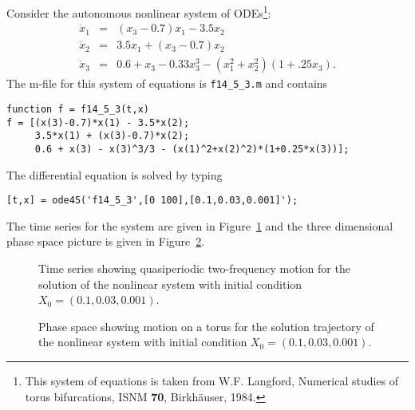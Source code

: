 \documentclass{ximera}
\begin{document}
Consider the autonomous nonlinear system of ODEs\footnote{This system of
equations is taken from W.F. Langford, Numerical studies of torus bifurcations, 
ISNM {\bf 70}, Birkh\"auser, 1984.}:
\begin{equation*}  \label{e:ftor3}
\begin{array}{rcl}
\dot{x}_1 & = & (x_3-0.7)x_1 - 3.5x_2\\
\dot{x}_2 & = &  3.5x_1 + (x_3-0.7)x_2 \\
\dot{x}_3 & = & 0.6 + x_3 - 0.33x_3^3 - (x_1^2+x_2^2)(1+.25x_3).
\end{array}
\end{equation*}
The m-file for this system of equations is 
{\tt f14\_5\_3.m} and contains
\begin{verbatim}
function f = f14_5_3(t,x)
f = [(x(3)-0.7)*x(1) - 3.5*x(2); 
     3.5*x(1) + (x(3)-0.7)*x(2); 
     0.6 + x(3) - x(3)^3/3 - (x(1)^2+x(2)^2)*(1+0.25*x(3))];
\end{verbatim}
The differential equation  is solved by typing
\begin{verbatim}
[t,x] = ode45('f14_5_3',[0 100],[0.1,0.03,0.001]');
\end{verbatim}
The time series for the system  are given in 
Figure~\ref{F:tor3ts} and the three dimensional phase space
 picture is given in Figure~\ref{F:tor3ps}.

\begin{figure}[htb]
   \centerline{%
   }
   \caption{Time series showing quasiperiodic two-frequency motion for the 
	solution of the nonlinear system \protect{} with initial 
	condition $X_0=(0.1,0.03,0.001)$.}
   \label{F:tor3ts}
\end{figure}

\begin{figure}[htb]
   \centerline{%
   }
   \caption{Phase space showing motion on a torus for the solution trajectory 
	of the nonlinear system \protect{} with initial condition 
	$X_0=(0.1,0.03,0.001)$.}
   \label{F:tor3ps}
\end{figure}


\EXER

\CEXER
\end{document}
